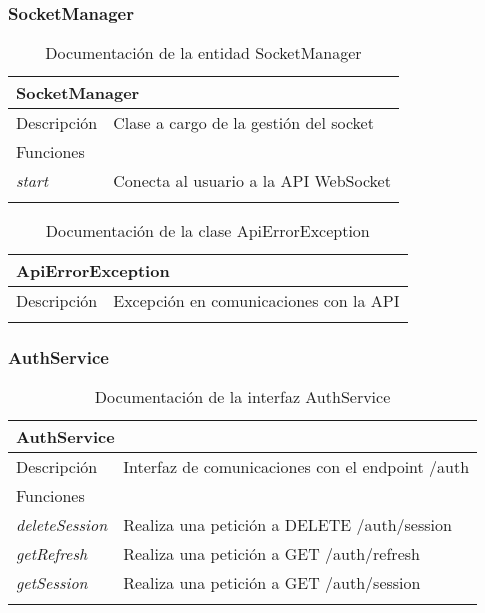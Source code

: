 \subsubsection{SocketManager}

\begin{longtable}{|p{} p{}|}
    \hline
    \multicolumn{2}{|l|}{SocketManager} \\ \hline \hline
    Descripción      & Clase a cargo de la gestión del socket \\ \hline
    \multicolumn{2}{|l|}{Funciones} \\
    \emph{start}  & Conecta al usuario a la API WebSocket \\ \hline
    \caption{Documentación de la entidad SocketManager}
    \label{dis:app:socket_manager}
\end{longtable}

\begin{longtable}{|p{} p{}|}
    \hline
    \multicolumn{2}{|l|}{ApiErrorException} \\ \hline \hline
    Descripción      & Excepción en comunicaciones con la API \\ \hline
    \caption{Documentación de la clase ApiErrorException}
    \label{dis:app:api_error_exception}
\end{longtable}

\subsubsection{AuthService}

\begin{longtable}{|p{} p{}|}
    \hline
    \multicolumn{2}{|l|}{AuthService} \\ \hline \hline
    Descripción      & Interfaz de comunicaciones con el endpoint /auth \\ \hline
    \multicolumn{2}{|l|}{Funciones} \\
    \emph{deleteSession}    & Realiza una petición a DELETE /auth/session \\
    \emph{getRefresh}       & Realiza una petición a GET /auth/refresh \\
    \emph{getSession}       & Realiza una petición a GET /auth/session \\ \hline
    \caption{Documentación de la interfaz AuthService}
    \label{dis:app:auth_service}
\end{longtable}

